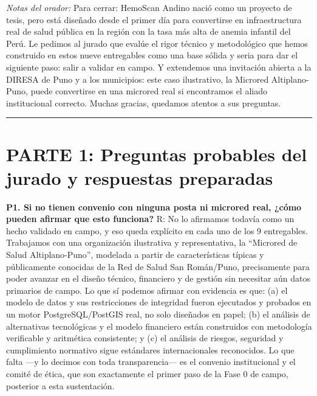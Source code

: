 \documentclass[11pt,a4paper]{article}
\begin{document}
\emph{Notas del orador:} Para cerrar: HemoScan Andino nació como un proyecto de tesis, pero está diseñado desde el primer día para convertirse en infraestructura real de salud pública en la región con la tasa más alta de anemia infantil del Perú. Le pedimos al jurado que evalúe el rigor técnico y metodológico que hemos construido en estos nueve entregables como una base sólida y seria para dar el siguiente paso: salir a validar en campo. Y extendemos una invitación abierta a la DIRESA de Puno y a los municipios: este caso ilustrativo, la Microred Altiplano-Puno, puede convertirse en una microred real si encontramos el aliado institucional correcto. Muchas gracias, quedamos atentos a sus preguntas.

\begin{center}\rule{0.5\linewidth}{0.5pt}\end{center}

\section{PARTE 1: Preguntas probables del jurado y respuestas preparadas}\label{parte-1-preguntas-probables-del-jurado-y-respuestas-preparadas}

\textbf{P1. Si no tienen convenio con ninguna posta ni microred real, ¿cómo pueden afirmar que esto funciona?}
R: No lo afirmamos todavía como un hecho validado en campo, y eso queda explícito en cada uno de los 9 entregables. Trabajamos con una organización ilustrativa y representativa, la ``Microred de Salud Altiplano-Puno'', modelada a partir de características típicas y públicamente conocidas de la Red de Salud San Román/Puno, precisamente para poder avanzar en el diseño técnico, financiero y de gestión sin necesitar aún datos primarios de campo. Lo que sí podemos afirmar con evidencia es que: (a) el modelo de datos y sus restricciones de integridad fueron ejecutados y probados en un motor PostgreSQL/PostGIS real, no solo diseñados en papel; (b) el análisis de alternativas tecnológicas y el modelo financiero están construidos con metodología verificable y aritmética consistente; y (c) el análisis de riesgos, seguridad y cumplimiento normativo sigue estándares internacionales reconocidos. Lo que falta ---y lo decimos con toda transparencia--- es el convenio institucional y el comité de ética, que son exactamente el primer paso de la Fase 0 de campo, posterior a esta sustentación.
\end{document}
